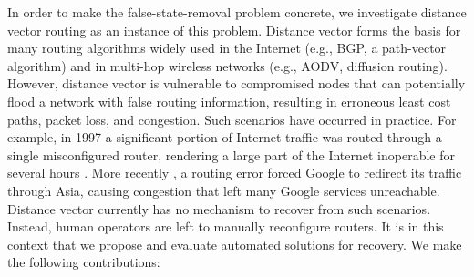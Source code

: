 \documentclass[10pt,conference]{IEEEtran}
\begin{document}
In order to make the false-state-removal problem concrete, we investigate distance vector routing as an instance of this problem. Distance vector forms the basis for many routing 
algorithms widely used in the Internet (e.g., BGP, a path-vector algorithm) and in multi-hop wireless networks (e.g., AODV, diffusion routing). However, distance vector is vulnerable 
to compromised nodes that can potentially flood a network with false routing information, resulting in erroneous least cost paths, packet loss, and congestion. Such scenarios have occurred
in practice. For example, in 1997 a significant portion of Internet traffic was routed through a single misconfigured router, rendering a large part of the Internet inoperable for several
hours \cite{Neumann97}. More recently \cite{Google}, a routing error forced Google to redirect its traffic through Asia, causing congestion that left many Google services unreachable. 
Distance vector currently has no mechanism to recover from such scenarios. Instead, human operators are left to manually reconfigure routers. It is in this context that we propose and
evaluate automated solutions for recovery.  We make the following contributions:
\end{document}
